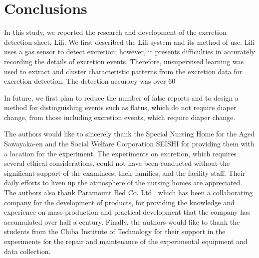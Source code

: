 \documentclass[publish,JRM,paper]{jaciiiarticle}
\begin{document}
\section{Conclusions}
In this study, we reported the research and development of the excretion detection sheet, Lifi. We first described the Lifi system and its method of use. Lifi uses a gas sensor to detect excretion; however, it presents difficulties in accurately recording the details of excretion events. Therefore, unsupervised learning was used to extract and cluster characteristic patterns from the excretion data for excretion detection. The detection accuracy was over 60%

In future, we first plan to reduce the number of false reports and to design a method for distinguishing events such as flatus, which do not require diaper change, from those including excretion events, which require diaper change.

\acknowledgements
The authors would like to sincerely thank the Special Nursing Home for the Aged Sawayaka-en and the Social Welfare Corporation SEISHI for providing them with a location for the experiment. The experiments on excretion, which requires several ethical considerations, could not have been conducted without the significant support of the examinees, their families, and the facility staff. Their daily efforts to liven up the atmosphere of the nursing homes are appreciated. The authors also thank Paramount Bed Co. Ltd., which has been a collaborating company for the development of products, for providing the knowledge and experience on mass production and practical development that the company has accumulated over half a century. Finally, the authors would like to thank the students from the Chiba Institute of Technology for their support in the experiments for the repair and maintenance of the experimental equipment and data collection.

%

\end{document}
